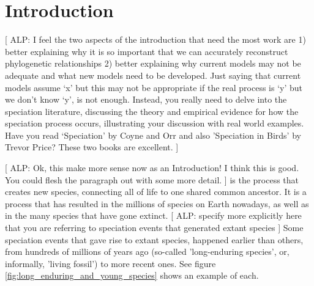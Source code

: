 \chapter{Introduction}
\label{chapter_introduction}
\newpage

[
  ALP:
  I feel the two aspects of the introduction that need the most work are 
  1) better explaining why it is so important 
     that we can accurately reconstruct phylogenetic relationships 
  2) better explaining why current models may not be adequate 
     and what new models need to be developed. Just saying that current 
     models assume ‘x’ but this may not be appropriate if the real process 
     is ‘y’ but we don’t know ‘y’, is not enough. Instead, you really need to 
     delve into the speciation literature, discussing the theory and 
     empirical evidence for how the speciation process occurs, 
     illustrating your discussion with real world examples. 
     Have you read ‘Speciation' by Coyne and Orr and also 'Speciation 
     in Birds' by Trevor Price? These two books are excellent.
]

\noindent 
{} 
[
  ALP:
  Ok, this make more sense now as an Introduction! 
  I think this is good. You could flesh the paragraph out with some more detail.
]
is the process that creates new species,
connecting all of life to one shared common ancestor. It is a process
that has resulted in the millions of species on Earth nowadays, 
as well as in the many species that have gone extinct.
[
  ALP:
  specify more explicitly here that you are referring to 
  speciation events that generated extant species
]
Some speciation events that gave rise to extant species, 
happened earlier than others,
from hundreds of millions of years ago (so-called 'long-enduring species',
or, informally, 'living fossil') 
to more recent ones. See figure \ref{fig:long_enduring_and_young_species} 
shows an example of each.

